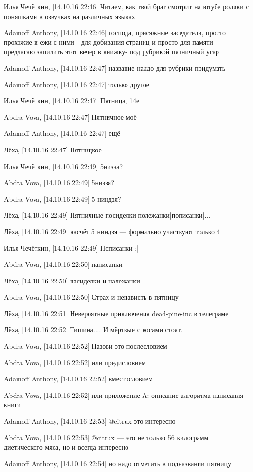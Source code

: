 Илья Чечёткин, [14.10.16 22:46]
Читаем, как твой брат смотрит на ютубе ролики с поняшками в озвучках на различных языках

Adamoff Anthony, [14.10.16 22:46]
господа, присяжные заседатели, просто прохожие и ежи с ними - для добивания страниц и просто для памяти - предлагаю запилить этот вечер в книжку- под рубрикой пятничный угар

Adamoff Anthony, [14.10.16 22:47]
название налдо для рубрики придумать

Adamoff Anthony, [14.10.16 22:47]
только другое

Илья Чечёткин, [14.10.16 22:47]
Пятница, 14е

Abdra Vova, [14.10.16 22:47]
Пятничное моё

Adamoff Anthony, [14.10.16 22:47]
ещё

Лёха, [14.10.16 22:47]
Пятницкое

Илья Чечёткин, [14.10.16 22:49]
5низза?

Abdra Vova, [14.10.16 22:49]
5низзя?

Abdra Vova, [14.10.16 22:49]
5 ниндзя?

Лёха, [14.10.16 22:49]
Пятничные посиделки|полежанки|пописанки|...

Лёха, [14.10.16 22:49]
насчёт 5 ниндзя — формально участвуют только 4

Илья Чечёткин, [14.10.16 22:49]
Пописанки :|

Abdra Vova, [14.10.16 22:50]
написанки

Лёха, [14.10.16 22:50]
насиделки и належанки

Abdra Vova, [14.10.16 22:50]
Страх и ненависть в пятницу

Лёха, [14.10.16 22:51]
Невероятные приключения dead-pine-inc в телеграме

Лёха, [14.10.16 22:52]
Тишина....
И мёртвые с косами стоят.

Abdra Vova, [14.10.16 22:52]
Назови это послесловием

Abdra Vova, [14.10.16 22:52]
или предисловием

Adamoff Anthony, [14.10.16 22:52]
вместословием

Abdra Vova, [14.10.16 22:52]
или приложение А: описание алгоритма написания книги

Adamoff Anthony, [14.10.16 22:53]
@citrux это интересно

Abdra Vova, [14.10.16 22:53]
@citrux — это не только 56 килограмм диетического мяса, но и всегда интересно

Adamoff Anthony, [14.10.16 22:54]
но надо отметить в подназвании пятницу

